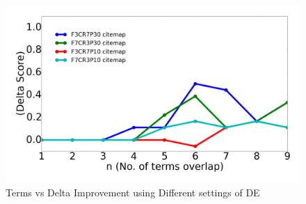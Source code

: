 \documentclass[10pt,conference]{IEEEtran}
\theoremstyle{break}
\begin{document}
\begin{figure}[!b]
  \includegraphics[width=\linewidth]{./fig/citemap.png}
  \caption{Terms vs Delta Improvement using Different settings of DE}
  \label{fig:RQ4}
\end{figure}
\end{document}
